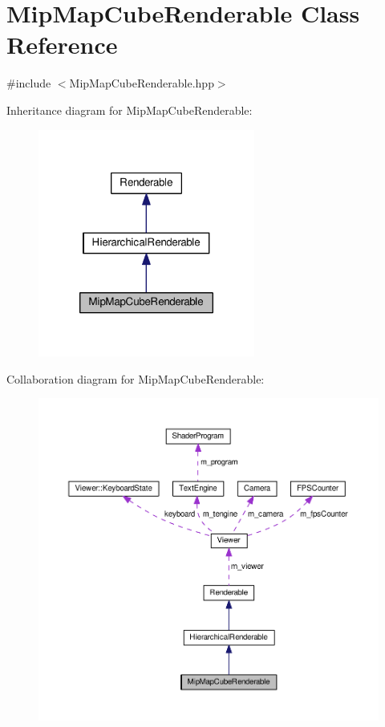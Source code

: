 \hypertarget{classMipMapCubeRenderable}{\section{Mip\+Map\+Cube\+Renderable Class Reference}
\label{classMipMapCubeRenderable}
}


{\ttfamily \#include $<$Mip\+Map\+Cube\+Renderable.\+hpp$>$}



Inheritance diagram for Mip\+Map\+Cube\+Renderable\+:\nopagebreak
\begin{figure}[H]
\begin{center}
\leavevmode
\includegraphics[width=202pt]{classMipMapCubeRenderable__inherit__graph}
\end{center}
\end{figure}


Collaboration diagram for Mip\+Map\+Cube\+Renderable\+:\nopagebreak
\begin{figure}[H]
\begin{center}
\leavevmode
\includegraphics[width=350pt]{classMipMapCubeRenderable__coll__graph}
\end{center}
\end{figure}

